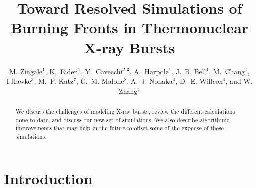 \documentclass[a4paper]{jpconf}
\begin{document}
\title{Toward Resolved Simulations of Burning Fronts in Thermonuclear
       X-ray Bursts}

\author{M. Zingale$^1$,
        K.~Eiden$^1$,
        Y.~Cavecchi$^{2,3}$,
        A.~Harpole$^1$,
        J.~B. Bell$^4$,
        M.~Chang$^1$,
        I.Hawke$^3$,
        M.~P. Katz$^7$,
        C.~M. Malone$^8$,
        A.~J. Nonaka$^4$,
        D.~E. Willcox$^4$, and
        W. Zhang$^4$}

\address{$^1$Department of Physics and Astronomy, Stony Brook
  University, Stony Brook, NY 11794-3800 USA}

\address{$^2$Department of Astrophysical Sciences, Princeton University,
  Peyton Hall, Princeton, NJ 08544, USA}

\address{$^3$Mathematical Sciences and STAG Research Centre,
  University of Southampton, SO17 1BJ, UK}

\address{$^4$Center for Computational Sciences and Engineering,
  Lawrence Berkeley National Lab, Berkeley, CA 94720 USA}

\address{$^5$National Energy Research Scientific Computing Center,
  Lawrence Berkeley National Lab, Berkeley, CA 94720 USA}

\address{$^6$Department of Physics and Astronomy, Michigan State
  University, East Lansing, Michigan 48824 USA}

\address{$^7$NVIDIA Corporation, 2788 San Tomas Expressway,
  Santa Clara, CA, 95050 USA}

\address{$^8$Los Alamos National Laboratory, Los Alamos, NM, 87545 USA}

\begin{abstract}
We discuss the challenges of modeling X-ray bursts, review the different
calculations done to date, and discuss our new set of simulations.  We also
describe algorithmic improvements that may help in the future to offset some
of the expense of these simulations.
\end{abstract}




\section{Introduction}
\end{document}
